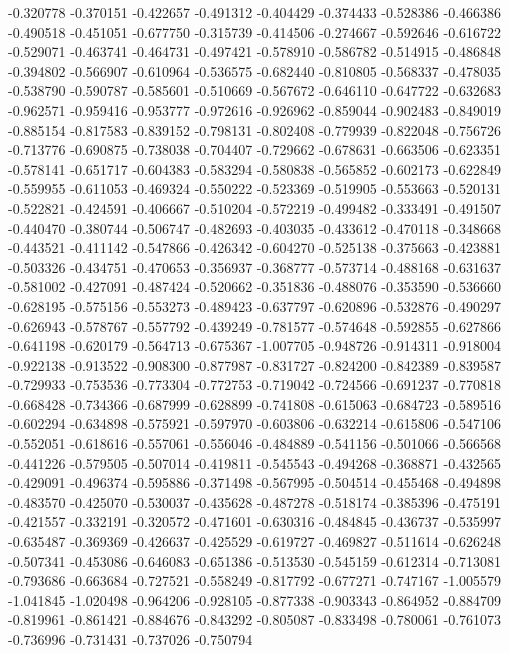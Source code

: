 -0.320778
-0.370151
-0.422657
-0.491312
-0.404429
-0.374433
-0.528386
-0.466386
-0.490518
-0.451051
-0.677750
-0.315739
-0.414506
-0.274667
-0.592646
-0.616722
-0.529071
-0.463741
-0.464731
-0.497421
-0.578910
-0.586782
-0.514915
-0.486848
-0.394802
-0.566907
-0.610964
-0.536575
-0.682440
-0.810805
-0.568337
-0.478035
-0.538790
-0.590787
-0.585601
-0.510669
-0.567672
-0.646110
-0.647722
-0.632683
-0.962571
-0.959416
-0.953777
-0.972616
-0.926962
-0.859044
-0.902483
-0.849019
-0.885154
-0.817583
-0.839152
-0.798131
-0.802408
-0.779939
-0.822048
-0.756726
-0.713776
-0.690875
-0.738038
-0.704407
-0.729662
-0.678631
-0.663506
-0.623351
-0.578141
-0.651717
-0.604383
-0.583294
-0.580838
-0.565852
-0.602173
-0.622849
-0.559955
-0.611053
-0.469324
-0.550222
-0.523369
-0.519905
-0.553663
-0.520131
-0.522821
-0.424591
-0.406667
-0.510204
-0.572219
-0.499482
-0.333491
-0.491507
-0.440470
-0.380744
-0.506747
-0.482693
-0.403035
-0.433612
-0.470118
-0.348668
-0.443521
-0.411142
-0.547866
-0.426342
-0.604270
-0.525138
-0.375663
-0.423881
-0.503326
-0.434751
-0.470653
-0.356937
-0.368777
-0.573714
-0.488168
-0.631637
-0.581002
-0.427091
-0.487424
-0.520662
-0.351836
-0.488076
-0.353590
-0.536660
-0.628195
-0.575156
-0.553273
-0.489423
-0.637797
-0.620896
-0.532876
-0.490297
-0.626943
-0.578767
-0.557792
-0.439249
-0.781577
-0.574648
-0.592855
-0.627866
-0.641198
-0.620179
-0.564713
-0.675367
-1.007705
-0.948726
-0.914311
-0.918004
-0.922138
-0.913522
-0.908300
-0.877987
-0.831727
-0.824200
-0.842389
-0.839587
-0.729933
-0.753536
-0.773304
-0.772753
-0.719042
-0.724566
-0.691237
-0.770818
-0.668428
-0.734366
-0.687999
-0.628899
-0.741808
-0.615063
-0.684723
-0.589516
-0.602294
-0.634898
-0.575921
-0.597970
-0.603806
-0.632214
-0.615806
-0.547106
-0.552051
-0.618616
-0.557061
-0.556046
-0.484889
-0.541156
-0.501066
-0.566568
-0.441226
-0.579505
-0.507014
-0.419811
-0.545543
-0.494268
-0.368871
-0.432565
-0.429091
-0.496374
-0.595886
-0.371498
-0.567995
-0.504514
-0.455468
-0.494898
-0.483570
-0.425070
-0.530037
-0.435628
-0.487278
-0.518174
-0.385396
-0.475191
-0.421557
-0.332191
-0.320572
-0.471601
-0.630316
-0.484845
-0.436737
-0.535997
-0.635487
-0.369369
-0.426637
-0.425529
-0.619727
-0.469827
-0.511614
-0.626248
-0.507341
-0.453086
-0.646083
-0.651386
-0.513530
-0.545159
-0.612314
-0.713081
-0.793686
-0.663684
-0.727521
-0.558249
-0.817792
-0.677271
-0.747167
-1.005579
-1.041845
-1.020498
-0.964206
-0.928105
-0.877338
-0.903343
-0.864952
-0.884709
-0.819961
-0.861421
-0.884676
-0.843292
-0.805087
-0.833498
-0.780061
-0.761073
-0.736996
-0.731431
-0.737026
-0.750794
